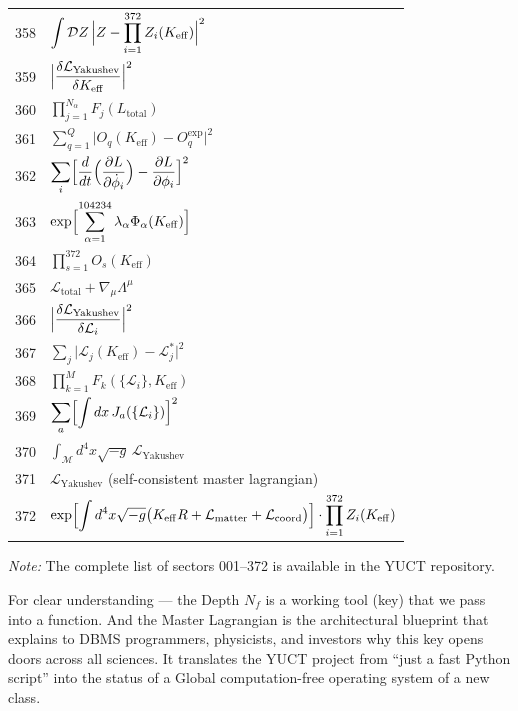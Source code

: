 \documentclass[12pt,a4paper]{article}
\begin{document}
\begin{longtable}{r p{}}
	358 & \(\displaystyle \int\mathcal{D}Z\,\Bigl|Z - \prod_{i=1}^{372}Z_i(K_{\mathrm{eff}})\Bigr|^2\) \\
	359 & \(\displaystyle \Bigl|\frac{\delta\mathcal{L}_{\text{Yakushev}}}{\delta K_{\mathrm{eff}}}\Bigr|^2\) \\
	360 & \(\displaystyle \prod_{j=1}^{N_\alpha}F_j(L_{\text{total}})\) \\
	361 & \(\displaystyle \sum_{q=1}^Q\bigl|O_q(K_{\mathrm{eff}}) - O_q^{\text{exp}}\bigr|^2\) \\
	362 & \(\displaystyle \sum_i\Bigl[\frac{d}{dt}\Bigl(\frac{\partial L}{\partial\dot\phi_i}\Bigr) - \frac{\partial L}{\partial\phi_i}\Bigr]^2\) \\
	363 & \(\displaystyle \exp\Bigl[\sum_{\alpha=1}^{104234}\lambda_\alpha\Phi_\alpha(K_{\mathrm{eff}})\Bigr]\) \\
	364 & \(\displaystyle \prod_{s=1}^{372}O_s(K_{\mathrm{eff}})\) \\
	365 & \(\displaystyle \mathcal{L}_{\text{total}} + \nabla_\mu\Lambda^\mu\) \\
	366 & \(\displaystyle \Bigl|\frac{\delta\mathcal{L}_{\text{Yakushev}}}{\delta\mathcal{L}_i}\Bigr|^2\) \\
	367 & \(\displaystyle \sum_j\bigl|\mathcal{L}_j(K_{\mathrm{eff}}) - \mathcal{L}_j^*\bigr|^2\) \\
	368 & \(\displaystyle \prod_{k=1}^M F_k(\{\mathcal{L}_i\},K_{\mathrm{eff}})\) \\
	369 & \(\displaystyle \sum_a\Bigl[\int dx\,J_a(\{\mathcal{L}_i\})\Bigr]^2\) \\
	370 & \(\displaystyle \int_{\mathcal{M}} d^4x\sqrt{-g}\,\mathcal{L}_{\text{Yakushev}}\) \\
	371 & \(\displaystyle \mathcal{L}_{\text{Yakushev}}\) (self-consistent master lagrangian) \\
	372 & \(\displaystyle \exp\Bigl[\int d^4x\sqrt{-g}\bigl(K_{\mathrm{eff}}R + \mathcal{L}_{\text{matter}} + \mathcal{L}_{\text{coord}}\bigr)\Bigr]\cdot\prod_{i=1}^{372}Z_i(K_{\mathrm{eff}})\) \\
	
\end{longtable}
	
	\textit{Note:} The complete list of sectors 001–372 is available in the YUCT repository.
	
	\small
	For clear understanding — the Depth \(N_{f}\) is a working tool (key) that we pass into a function. And the Master Lagrangian is the architectural blueprint that explains to DBMS programmers, physicists, and investors why this key opens doors across all sciences. It translates the YUCT project from “just a fast Python script” into the status of a Global computation-free operating system of a new class.
	
\end{document}
